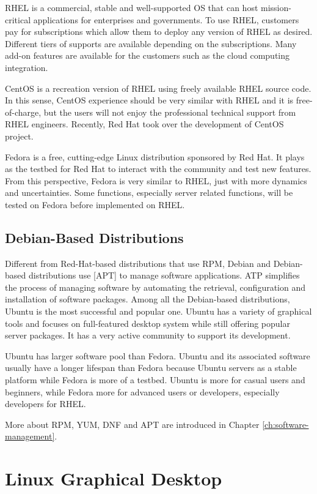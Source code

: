 RHEL is a commercial, stable and well-supported OS that can host mission-critical applications for enterprises and governments. To use RHEL, customers pay for subscriptions which allow them to deploy any version of RHEL as desired. Different tiers of supports are available depending on the subscriptions. Many add-on features are available for the customers such as the cloud computing integration.

CentOS is a recreation version of RHEL using freely available RHEL source code. In this sense, CentOS experience should be very similar with RHEL and it is free-of-charge, but the users will not enjoy the professional technical support from RHEL engineers. Recently, Red Hat took over the development of CentOS project.

Fedora is a free, cutting-edge Linux distribution sponsored by Red Hat. It plays as the testbed for Red Hat to interact with the community and test new features. From this perspective, Fedora is very similar to RHEL, just with more dynamics and uncertainties. Some functions, especially server related functions, will be tested on Fedora before implemented on RHEL.

\subsection{Debian-Based Distributions}

Different from Red-Hat-based distributions that use RPM, Debian and Debian-based distributions use [APT] to manage software applications. ATP simplifies the process of managing software by automating the retrieval, configuration and installation of software packages. Among all the Debian-based distributions, Ubuntu is the most successful and popular one. Ubuntu has a variety of graphical tools and focuses on full-featured desktop system while still offering popular server packages. It has a very active community to support its development.

Ubuntu has larger software pool than Fedora. Ubuntu and its associated software usually have a longer lifespan than Fedora because Ubuntu servers as a stable platform while Fedora is more of a testbed. Ubuntu is more for casual users and beginners, while Fedora more for advanced users or developers, especially developers for RHEL.

More about RPM, YUM, DNF and APT are introduced in Chapter \ref{ch:software-management}.

\section{Linux Graphical Desktop}

